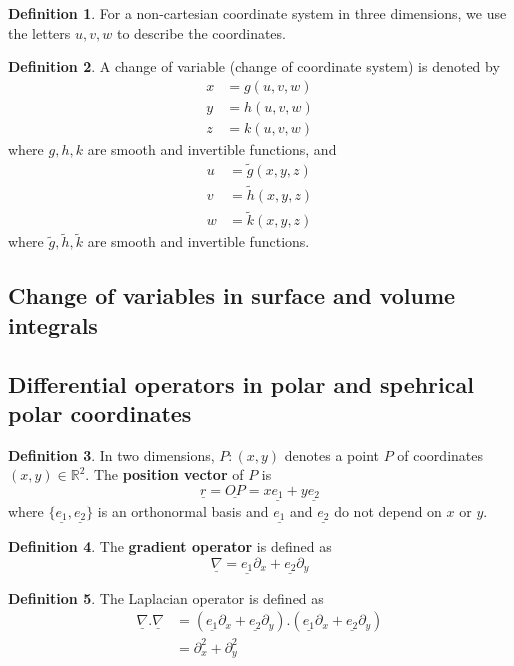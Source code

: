 \documentclass[12pt,a4paper]{article}
\theoremstyle{definition}
\newtheorem{definition}{Definition}[subsection]
\begin{document}
\begin{definition}
	For a non-cartesian coordinate system in three dimensions, we use the letters $u, v, w$ to describe the coordinates.
\end{definition}

\begin{definition}
	A change of variable (change of coordinate system) is denoted by
	\[
		\begin{aligned}
			x & = g(u, v, w) \\
			y & = h(u, v, w) \\
			z & = k(u, v, w)
		\end{aligned}
	\]
	where $g, h, k$ are smooth and invertible functions, and
	\[
		\begin{aligned}
			u & = \tilde{g}(x, y, z) \\
			v & = \tilde{h}(x, y, z) \\
			w & = \tilde{k}(x, y, z)
		\end{aligned}
	\]
	where $\tilde{g}, \tilde{h}, \tilde{k}$ are smooth and invertible functions.
\end{definition}

\subsection{Change of variables in surface and volume integrals}

\subsection{Differential operators in polar and spehrical polar coordinates}

\begin{definition}
	In two dimensions, $P: (x, y)$ denotes a point $P$ of coordinates $(x, y) \in \mathbb{R}^2$. The \textbf{position vector} of $P$ is
	\[
		\underline{r} = \underline{OP} = x \underline{e_1} + y \underline{e_2}
	\]
	where $\{ \underline{e_1}, \underline{e_2} \}$ is an orthonormal basis and $\underline{e_1}$ and $\underline{e_2}$ do not depend on $x$ or $y$.
\end{definition}

\begin{definition}
	The \textbf{gradient operator} is defined as
	\[
		\underline{\nabla} = \underline{e_1} \partial_x + \underline{e_2} \partial_y
	\]
\end{definition}

\begin{definition}
	The Laplacian operator is defined as
	\[
		\begin{aligned}
			\underline{\nabla} . \underline{\nabla}
				& = (\underline{e_1} \partial_x + \underline{e_2} \partial_y) . (\underline{e_1} \partial_x + \underline{e_2} \partial_y) \\
				& = \partial_x^2 + \partial_y^2
		\end{aligned}
	\]
\end{definition}
\end{document}
